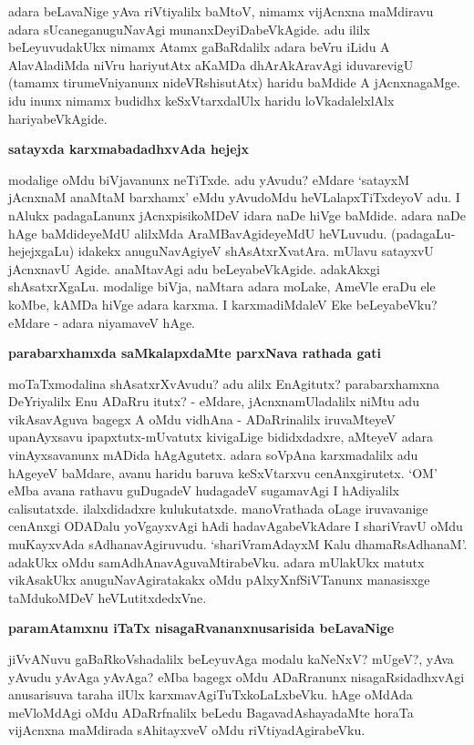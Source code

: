 adara beLavaNige yAva riVtiyalilx baMtoV, nimamx vijAcnxna maMdiravu adara sUcaneganuguNavAgi munanxDeyiDabeVkAgide. adu ililx beLeyuvudakUkx nimamx Atamx gaBaRdalilx adara beVru iLidu A AlavAladiMda niVru hariyutAtx aKaMDa dhArAkAravAgi iduvarevigU (tamamx tirumeVniyanunx nideVRshisutAtx) haridu baMdide A jAcnxnagaMge. idu inunx nimamx budidhx keSxVtarxdalUlx haridu loVkadalelxlAlx hariyabeVkAgide.

\noindent
\textbf{satayxda karxmabadadhxvAda hejejx}\label{page76}

modalige oMdu biVjavanunx neTiTxde. adu yAvudu? eMdare `satayxM jAcnxnaM anaMtaM barxhamx' eMdu yAvudoMdu heVLalapxTiTxdeyoV adu. I nAlukx padagaLanunx jAcnxpisikoMDeV idara naDe hiVge baMdide. adara naDe hAge baMdideyeMdU alilxMda AraMBavAgideyeMdU heVLuvudu. (padagaLu-hejejxgaLu) idakekx anuguNavAgiyeV shAsAtxrXvatAra. mUlavu satayxvU jAcnxnavU Agide. anaMtavAgi adu beLeyabeVkAgide. adakAkxgi shAsatxrXgaLu. modalige biVja, naMtara adara moLake, AmeVle eraDu ele koMbe, kAMDa hiVge adara karxma. I karxmadiMdaleV Eke beLeyabeVku? eMdare - adara niyamaveV hAge.

\noindent
\textbf{parabarxhamxda saMkalapxdaMte parxNava rathada gati}\label{page77}

moTaTxmodalina shAsatxrXvAvudu? adu alilx EnAgitutx? parabarxhamxna DeYriyalilx Enu ADaRru itutx? - eMdare, jAcnxnamUladalilx niMtu adu vikAsavAguva bagegx A oMdu vidhAna - ADaRrinalilx iruvaMteyeV upanAyxsavu ipapxtutx-mUvatutx kivigaLige bididxdadxre, aMteyeV adara vinAyxsavanunx mADida hAgAgutetx. adara soVpAna karxmadalilx adu hAgeyeV baMdare, avanu haridu baruva keSxVtarxvu cenAnxgirutetx. `OM' eMba avana rathavu guDugadeV hudagadeV sugamavAgi I hAdiyalilx calisutatxde. ilalxdidadxre kulukutatxde. manoVrathada oLage iruvavanige cenAnxgi ODADalu yoVgayxvAgi hAdi hadavAgabeVkAdare I shariVravU oMdu muKayxvAda sAdhanavAgiruvudu. `shariVramAdayxM Kalu\label{77} dhamaRsAdhanaM'. adakUkx oMdu samAdhAnavAguvaMtirabeVku. adara mUlakUkx matutx vikAsakUkx anuguNavAgiratakakx oMdu pAlxyXnfSiVTanunx manasisxge taMdukoMDeV heVLutitxdedxVne.

\noindent
\textbf{paramAtamxnu iTaTx nisagaRvananxnusarisida beLavaNige}\label{page77}

jiVvANuvu gaBaRkoVshadalilx beLeyuvAga modalu kaNeNxV? mUgeV?, yAva yAvudu yAvAga yAvAga? eMba bagegx oMdu ADaRranunx nisagaRsidadhxvAgi anusarisuva taraha ilUlx karxmavAgiTuTxkoLaLxbeVku. hAge oMdAda meVloMdAgi oMdu ADaRrfnalilx beLedu BagavadAshayadaMte horaTa vijAcnxna maMdirada sAhitayxveV oMdu riVtiyadAgirabeVku.

